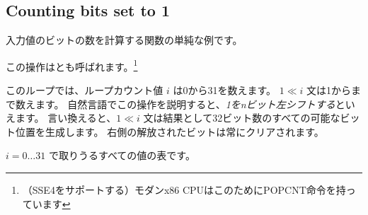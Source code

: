 ﻿\subsection{Counting bits set to 1}

入力値のビットの数を計算する関数の単純な例です。

この操作はとも呼ばれます。\footnote{（SSE4をサポートする）モダンx86 CPUはこのためにPOPCNT命令を持っています}



このループでは、ループカウント値 $i$ は0から31を数えます。
$1 \ll i$ 文は1からまで数えます。
自然言語でこの操作を説明すると、\emph{1をnビット左シフトする}といえます。
言い換えると、$1 \ll i$ 文は結果として32ビット数のすべての可能なビット位置を生成します。
右側の解放されたビットは常にクリアされます。

\label{2n_numbers_table}
$i=0 \ldots 31$ で取りうるすべての値の表です。

